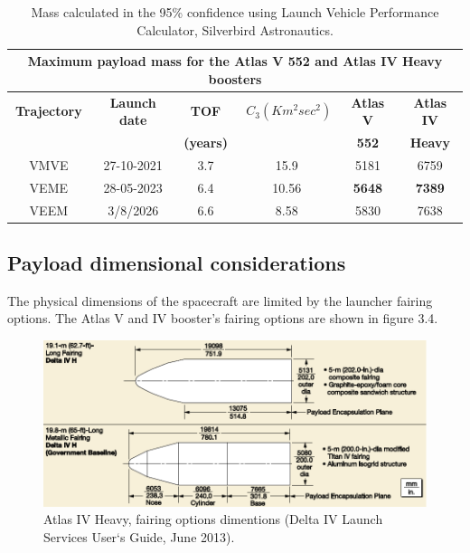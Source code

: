 \begin{table}[h!]
  \centering
    \begin{tabular}{|c|r|r|r|r|r|}
    \multicolumn{6}{c}{\textbf{Maximum payload mass for the Atlas V 552 and Atlas IV Heavy boosters}} \bigstrut[b]\\
    \hline
    \textbf{Trajectory} & \multicolumn{1}{c|}{\textbf{Launch date}} & \multicolumn{1}{c|}{\textbf{TOF }} & $C_3(Km^{2}sec^{2})$ & \multicolumn{1}{c|}{\textbf{Atlas V }} & \multicolumn{1}{c|}{\textbf{Atlas IV}} \bigstrut[t]\\
    \textbf{} & \multicolumn{1}{c|}{\textbf{}} & \multicolumn{1}{c|}{\textbf{(years)}} & \multicolumn{1}{c|}{\textbf{}} & \multicolumn{1}{c|}{\textbf{552}} & \multicolumn{1}{c|}{\textbf{Heavy}} \bigstrut[b]\\
    \hline
    VMVE  & \multicolumn{1}{c|}{27-10-2021} & \multicolumn{1}{c|}{3.7} & \multicolumn{1}{c|}{15.9} & \multicolumn{1}{c|}{5181} & \multicolumn{1}{c|}{6759} \bigstrut\\
    \hline
    VEME  & \multicolumn{1}{c|}{28-05-2023} & \multicolumn{1}{c|}{6.4} & \multicolumn{1}{c|}{10.56} & \multicolumn{1}{c|}{\textbf{5648}} & \multicolumn{1}{c|}{\textbf{7389}} \bigstrut\\
    \hline
    VEEM  & \multicolumn{1}{c|}{3/8/2026} & \multicolumn{1}{c|}{6.6} & \multicolumn{1}{c|}{8.58} & \multicolumn{1}{c|}{5830} & \multicolumn{1}{c|}{7638} \bigstrut\\
    \hline
    \end{tabular}%
    \caption{Mass calculated in the 95\% confidence using Launch Vehicle Performance Calculator, Silverbird Astronautics.}
  \label{tab:trajKg}%
\end{table}%

\subsection{Payload dimensional considerations}
The physical dimensions of the spacecraft are limited by the launcher fairing options. The Atlas V and IV booster’s fairing options are shown in figure 3.4.

\begin{figure}[h!]
\centering
\includegraphics[width=1\textwidth]{figures/Orbiter/fairingsIV.png}
\caption{Atlas IV Heavy, fairing options dimentions (Delta IV Launch Services User‘s Guide, June 2013).\cite{Atlasm}}
\end{figure}

